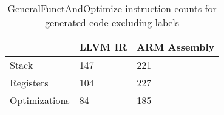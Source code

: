 \begin{table}[h!]
\centering
\begin{tabular}{p{}p{}p{}}
  \hline
 & LLVM IR & ARM Assembly \\ 
  \hline
Stack & 147 & 221 \\ 
  Registers & 104 & 227 \\ 
  Optimizations &  84 & 185 \\ 
   \hline
\end{tabular}
\caption{GeneralFunctAndOptimize instruction counts for generated code excluding labels}
\end{table}
